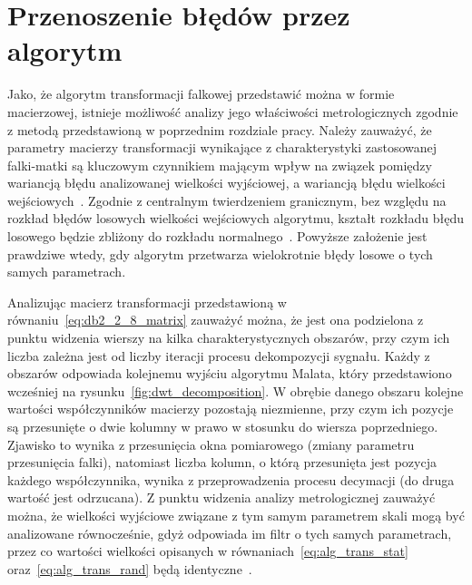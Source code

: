 \section{Przenoszenie błędów przez algorytm}

Jako, że algorytm transformacji falkowej przedstawić można w formie macierzowej, istnieje możliwość analizy jego właściwości metrologicznych zgodnie z metodą przedstawioną w poprzednim rozdziale pracy. Należy zauważyć, że parametry macierzy transformacji wynikające z charakterystyki zastosowanej falki-matki są kluczowym czynnikiem mającym wpływ na związek pomiędzy wariancją błędu analizowanej wielkości wyjściowej, a wariancją błędu wielkości wejściowych~\cite{auth_electronics}. Zgodnie z centralnym twierdzeniem granicznym, bez względu na rozkład błędów losowych wielkości wejściowych algorytmu, kształt rozkładu błędu losowego będzie zbliżony do rozkładu normalnego~\cite{jcgm_guide}. Powyższe założenie jest prawdziwe wtedy, gdy algorytm przetwarza wielokrotnie błędy losowe o tych samych parametrach.

Analizując macierz transformacji przedstawioną w równaniu~\eqref{eq:db2_2_8_matrix} zauważyć można, że jest ona podzielona z punktu widzenia wierszy na kilka charakterystycznych obszarów, przy czym ich liczba zależna jest od liczby iteracji procesu dekompozycji sygnału. Każdy z obszarów odpowiada kolejnemu wyjściu algorytmu Malata, który przedstawiono wcześniej na rysunku~\ref{fig:dwt_decomposition}. W obrębie danego obszaru kolejne wartości współczynników macierzy pozostają niezmienne, przy czym ich pozycje są przesunięte o dwie kolumny w prawo w stosunku do wiersza poprzedniego. Zjawisko to wynika z przesunięcia okna pomiarowego (zmiany parametru przesunięcia falki), natomiast liczba kolumn, o którą przesunięta jest pozycja każdego współczynnika, wynika z przeprowadzenia procesu decymacji (do druga wartość jest odrzucana). Z punktu widzenia analizy metrologicznej zauważyć można, że wielkości wyjściowe związane z tym samym parametrem skali mogą być analizowane równocześnie, gdyż odpowiada im filtr o tych samych parametrach, przez co wartości wielkości opisanych w równaniach~\eqref{eq:alg_trans_stat} oraz~\eqref{eq:alg_trans_rand} będą identyczne~\cite{auth_electronics}.

